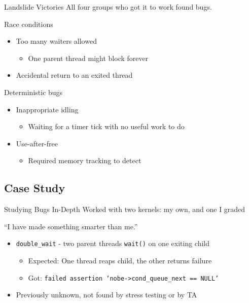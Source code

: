 \documentclass[xcolor=dvipsnames]{beamer}
\begin{document}
\begin{frame}{Landslide Victories} %
	All four groups who got it to work found bugs.
	\linegap
	
	Race conditions
	\begin{itemize}
		\item Too many waiters allowed
		\begin{itemize}
			\item One parent thread might block forever
		\end{itemize}
		\item Accidental return to an exited thread
	\end{itemize}
	\linegap

	Deterministic bugs
	\begin{itemize}
		\item Inappropriate idling
		\begin{itemize}
			\item Waiting for a timer tick with no useful work to do
		\end{itemize}
		\item Use-after-free
		\begin{itemize}
			\item Required memory tracking to detect
		\end{itemize}
	\end{itemize}
\end{frame}

\subsection{Case Study}

\begin{frame}{Studying Bugs In-Depth} %
	Worked with two kernels: my own, and one I graded
	\linegap

	``I have made something smarter than me.''
	\begin{itemize}
		\item \texttt{double\_wait} - two parent threads \texttt{wait()} on one exiting child
		\begin{itemize}
			\item Expected: One thread reaps child, the other returns failure
			\item Got: \texttt{failed assertion `nobe->cond\_queue\_next == NULL'}
		\end{itemize}
		\item Previously unknown, not found by stress testing or by TA
	\end{itemize}
\end{frame}
\end{document}
